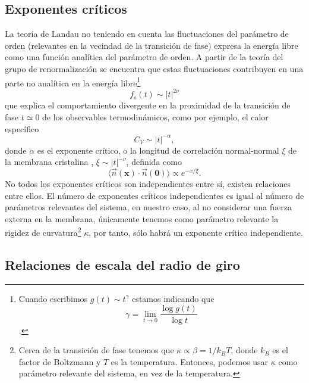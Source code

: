 \subsection{Exponentes críticos}
\label{exponentes_criticos}
La teoría de Landau no teniendo en cuenta las fluctuaciones del parámetro de
orden (relevantes en la vecindad de la transición de fase) expresa la energía
libre como una función analítica del parámetro de orden. A partir de la teoría
del grupo de renormalización \cite{Cardy} se encuentra que estas fluctuaciones contribuyen
en una parte no analítica en la energía libre\footnote{Cuando escribimos
  $g(t)\sim t^{\gamma}$ estamos indicando que $$\gamma=\lim_{t\rightarrow
  0}\frac{\log g(t)}{\log t}$$.}
\begin{equation}
f_s(t)\sim|t|^{2\nu}
\end{equation}
que explica el comportamiento divergente en la proximidad de la transición de
fase $t\simeq 0$ de los observables termodinámicos, como por ejemplo, el calor específico
\begin{equation*}
C_V\sim|t|^{-\alpha},
\end{equation*}
donde $\alpha$ es el exponente crítico, o la longitud de correlación
normal-normal $\xi$ de la membrana cristalina \cite{David:normal}, $\xi\sim|t|^{-\nu}$,
definida como
\begin{equation*}
\langle \vec{n}(\mathbf{x})\cdot\vec{n}(\mathbf{0})\rangle\propto e^{-x/\xi}.
\end{equation*}
No todos los exponentes críticos son independientes entre sí, existen
relaciones entre ellos. El número de exponentes críticos independientes es
igual al número de parámetros relevantes del sistema, en nuestro caso, al no
considerar una fuerza externa en la membrana, únicamente tenemos como
parámetro relevante la rigidez de curvatura\footnote{Cerca de la transición de
  fase tenemos que $\kappa\propto \beta=1/k_BT$, donde $k_B$ es el factor de
  Boltzmann y $T$ es la temperatura. Entonces, podemos usar $\kappa$ como
  parámetro relevante del sistema, en vez de la temperatura.}  $\kappa$, por
tanto, sólo habrá un exponente 
crítico independiente.

\subsection{Relaciones de escala del radio de giro}

